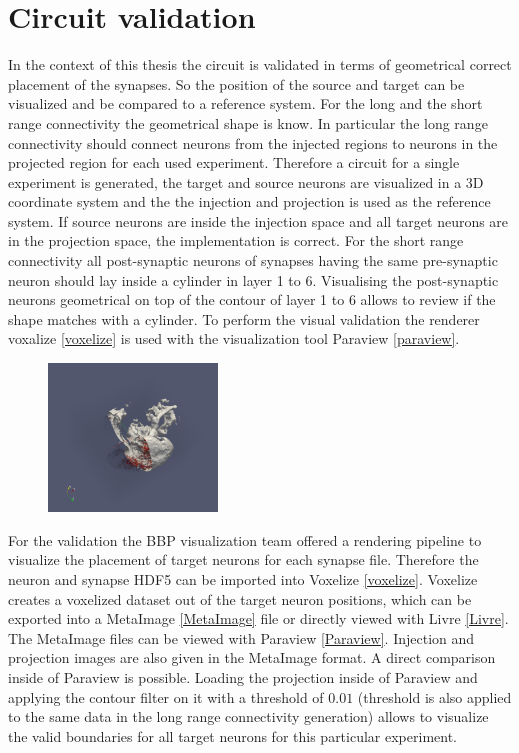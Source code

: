\newpage
\section{Circuit validation}
In the context of this thesis the circuit is validated in terms of geometrical correct placement of
the synapses. So the position of the source and target can be visualized and be compared to a 
reference system. For the long and the short range connectivity the geometrical shape is know.
In particular the long range connectivity should connect neurons from the injected regions to neurons
in the projected region for each used experiment. Therefore a circuit for a single experiment is 
generated, the target and source neurons are visualized in a 3D coordinate system and the the injection
and projection is used as the reference system. If source neurons are inside the injection space and all
target neurons are in the projection space, the implementation is correct.
For the short range connectivity all post-synaptic neurons of synapses having the same pre-synaptic neuron should
lay inside a cylinder in layer 1 to 6. Visualising the post-synaptic neurons geometrical on top of the contour of layer 1 to 6 allows to review if the shape matches with a cylinder.
To perform the visual validation the renderer voxalize \ref{voxelize} is used with the visualization tool Paraview \ref{paraview}.
 \begin{figure}[ht!]
\centering
\includegraphics[width=0.4\textwidth]{pictures/paraview_ex.png}
\end{figure}
For the validation the BBP visualization team offered a rendering pipeline to visualize the placement of target neurons for each synapse file. Therefore the neuron and synapse HDF5 can be imported into 
Voxelize \ref{voxelize}. Voxelize creates a voxelized dataset out of the target neuron positions, which can be exported into
a MetaImage \ref{MetaImage} file or directly viewed with Livre \ref{Livre}.
The MetaImage files can be viewed with Paraview \ref{Paraview}.
Injection and projection images are also given in the MetaImage format.
A direct comparison inside of Paraview is possible.
Loading the projection inside of Paraview and applying the contour filter on it with a threshold of $0.01$ (threshold is also applied to the same data in the long range connectivity generation) allows to visualize the valid boundaries for all target neurons for this particular experiment.
 
